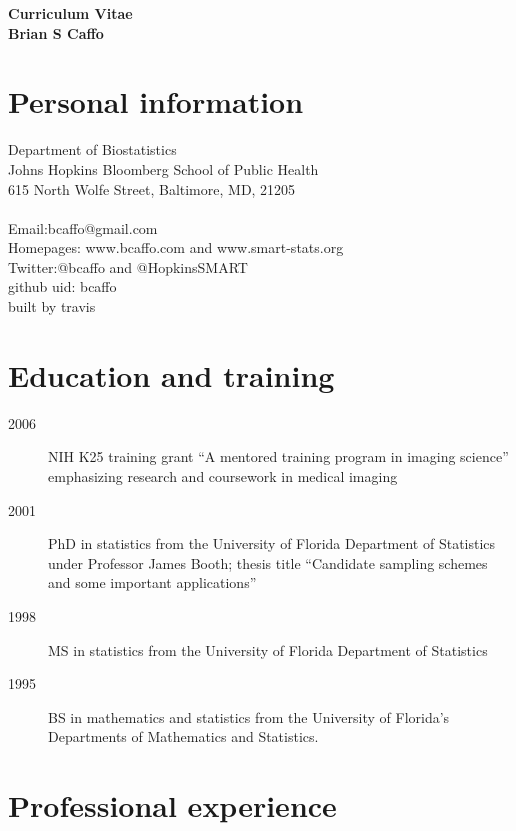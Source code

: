 \documentclass[12pt]{article}
\begin{document}
{ \vspace{-.5in}
\begin{center}
\large
\bf Curriculum Vitae\\
Brian S Caffo \\
\end{center}
}

\section*{Personal information}
Department of Biostatistics\\
Johns Hopkins Bloomberg School of Public Health \\ 
615 North Wolfe Street, Baltimore, MD, 21205 \\ \\
Email:bcaffo@gmail.com \\
Homepages: www.bcaffo.com and www.smart-stats.org \\
Twitter:@bcaffo and @HopkinsSMART \\
github uid: bcaffo\\
built by travis

\section*{Education and training}
\begin{description}
\item[\textnormal{2006}] NIH K25 training grant ``A mentored training program in imaging science'' emphasizing research and coursework in medical imaging
\item[\textnormal{2001}] PhD in statistics from the University of Florida Department of Statistics under Professor James Booth; thesis title ``Candidate sampling schemes and some important applications''
\item[\textnormal{1998}] MS in statistics from the University of Florida Department of Statistics
\item[\textnormal{1995}] BS in mathematics and statistics from the University of Florida's Departments of Mathematics and Statistics.
\end{description}


\section*{Professional experience}
\end{document}
